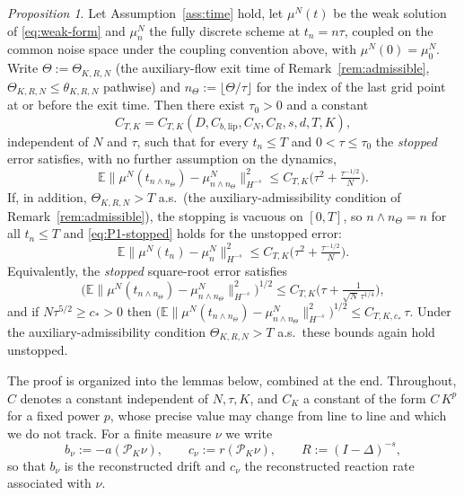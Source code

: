 \documentclass[a4paper,fleqn]{cas-sc}
\theoremstyle{definition}
\theoremstyle{remark}
\newtheorem{proposition}{Proposition}
\begin{document}
\begin{proposition}
\label{prop:time_discrete_particle}
Let Assumption~\ref{ass:time} hold, let $\mu^N(t)$ be the weak solution of
\eqref{eq:weak-form} and $\mu^N_n$ the fully discrete scheme at $t_n=n\tau$, coupled on
the common noise space under the coupling convention above, with $\mu^N(0)=\mu^N_0$.
Write $\Theta:=\Theta_{K,R,N}$ (the auxiliary-flow exit time of
Remark~\ref{rem:admissible}, $\Theta_{K,R,N}\le\theta_{K,R,N}$ pathwise) and
$n_\Theta:=\lfloor\Theta/\tau\rfloor$ for the index
of the last grid point at or before the exit time. Then there exist $\tau_0>0$ and a
constant
\[
C_{T,K}=C_{T,K}(D,C_{b,\mathrm{lip}},C_N,C_R,s,d,T,K),
\]
independent of $N$ and $\tau$, such that for every $t_n\le T$ and $0<\tau\le\tau_0$ the
\emph{stopped} error satisfies, with no further assumption on the dynamics,
\begin{equation}\label{eq:P1-stopped}
\mathbb E\big\|\mu^N(t_{n\wedge n_\Theta})-\mu^N_{n\wedge n_\Theta}\big\|_{H^{-s}}^2
\le C_{T,K}\Big(\tau^2+\tfrac{\tau^{-1/2}}N\Big).
\end{equation}
If, in addition, $\Theta_{K,R,N}>T$ a.s.\ (the auxiliary-admissibility condition
of Remark~\ref{rem:admissible}), the stopping is vacuous on $[0,T]$, so
$n\wedge n_\Theta=n$ for all $t_n\le T$ and \eqref{eq:P1-stopped} holds for the
unstopped error:
\begin{equation}\label{eq:P1}
\mathbb E\big\|\mu^N(t_n)-\mu^N_n\big\|_{H^{-s}}^2
\le C_{T,K}\Big(\tau^2+\tfrac{\tau^{-1/2}}N\Big).
\end{equation}
Equivalently, the \emph{stopped} square-root error satisfies
\begin{equation}\label{eq:P2}
\Big(\mathbb E\big\|\mu^N(t_{n\wedge n_\Theta})-\mu^N_{n\wedge n_\Theta}\big\|_{H^{-s}}^2\Big)^{1/2}
\le C_{T,K}\Big(\tau+\tfrac1{\sqrt N\,\tau^{1/4}}\Big),
\end{equation}
and if $N\tau^{5/2}\ge c_*>0$ then
$\big(\mathbb E\|\mu^N(t_{n\wedge n_\Theta})-\mu^N_{n\wedge n_\Theta}\|_{H^{-s}}^2\big)^{1/2}\le C_{T,K,c_*}\,\tau$.
Under the auxiliary-admissibility condition $\Theta_{K,R,N}>T$ a.s.\ these bounds again hold unstopped.
\end{proposition}

The proof is organized into the lemmas below, combined at the end. Throughout,
$C$ denotes a constant independent of $N,\tau,K$, and $C_K$ a constant of the
form $C\,K^{p}$ for a fixed power $p$, whose precise value may change from line
to line and which we do not track. For a finite measure $\nu$ we write
\[
b_\nu:=-a(\mathcal P_K\nu),\qquad
c_\nu:=r(\mathcal P_K\nu),\qquad
R:=(I-\Delta)^{-s},
\]
so that $b_\nu$ is the reconstructed drift and $c_\nu$ the reconstructed reaction
rate associated with $\nu$.
\end{document}
